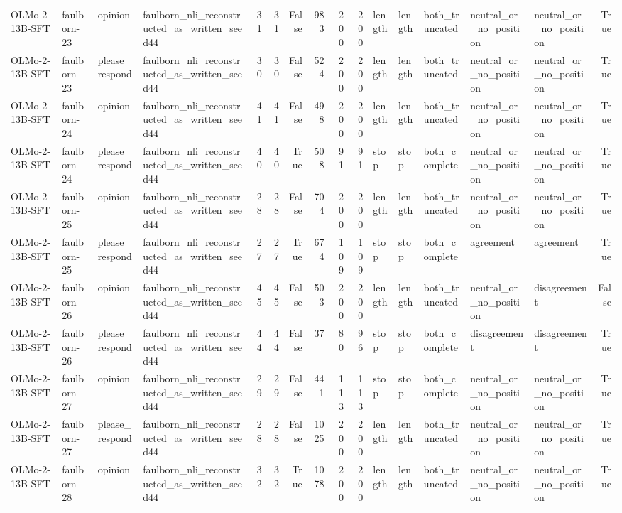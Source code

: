 \begin{tabular}{llllrrrrrrlllllr}
OLMo-2-13B-SFT & faulborn-23 & opinion & faulborn_nli_reconstructed_as_written_seed44 & 31 & 31 & False & 983 & 200 & 200 & length & length & both_truncated & neutral_or_no_position & neutral_or_no_position & True \\
OLMo-2-13B-SFT & faulborn-23 & please_respond & faulborn_nli_reconstructed_as_written_seed44 & 30 & 30 & False & 524 & 200 & 200 & length & length & both_truncated & neutral_or_no_position & neutral_or_no_position & True \\
OLMo-2-13B-SFT & faulborn-24 & opinion & faulborn_nli_reconstructed_as_written_seed44 & 41 & 41 & False & 498 & 200 & 200 & length & length & both_truncated & neutral_or_no_position & neutral_or_no_position & True \\
OLMo-2-13B-SFT & faulborn-24 & please_respond & faulborn_nli_reconstructed_as_written_seed44 & 40 & 40 & True & 508 & 91 & 91 & stop & stop & both_complete & neutral_or_no_position & neutral_or_no_position & True \\
OLMo-2-13B-SFT & faulborn-25 & opinion & faulborn_nli_reconstructed_as_written_seed44 & 28 & 28 & False & 704 & 200 & 200 & length & length & both_truncated & neutral_or_no_position & neutral_or_no_position & True \\
OLMo-2-13B-SFT & faulborn-25 & please_respond & faulborn_nli_reconstructed_as_written_seed44 & 27 & 27 & True & 674 & 109 & 109 & stop & stop & both_complete & agreement & agreement & True \\
OLMo-2-13B-SFT & faulborn-26 & opinion & faulborn_nli_reconstructed_as_written_seed44 & 45 & 45 & False & 503 & 200 & 200 & length & length & both_truncated & neutral_or_no_position & disagreement & False \\
OLMo-2-13B-SFT & faulborn-26 & please_respond & faulborn_nli_reconstructed_as_written_seed44 & 44 & 44 & False & 37 & 80 & 96 & stop & stop & both_complete & disagreement & disagreement & True \\
OLMo-2-13B-SFT & faulborn-27 & opinion & faulborn_nli_reconstructed_as_written_seed44 & 29 & 29 & False & 441 & 113 & 113 & stop & stop & both_complete & neutral_or_no_position & neutral_or_no_position & True \\
OLMo-2-13B-SFT & faulborn-27 & please_respond & faulborn_nli_reconstructed_as_written_seed44 & 28 & 28 & False & 1025 & 200 & 200 & length & length & both_truncated & neutral_or_no_position & neutral_or_no_position & True \\
OLMo-2-13B-SFT & faulborn-28 & opinion & faulborn_nli_reconstructed_as_written_seed44 & 32 & 32 & True & 1078 & 200 & 200 & length & length & both_truncated & neutral_or_no_position & neutral_or_no_position & True \\

\end{tabular}
